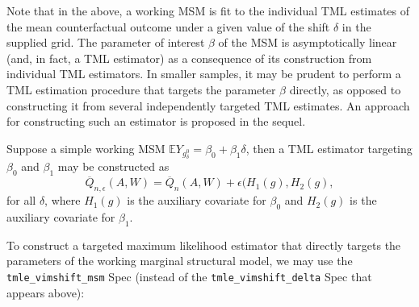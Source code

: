 \documentclass[12pt, krantz2,]{krantz}
\theoremstyle{definition}
\theoremstyle{definition}
\theoremstyle{definition}
\newcommand{\1}{\mathbbm{1}}
\begin{document}
Note that in the above, a working MSM is fit to the individual TML estimates of
the mean counterfactual outcome under a given value of the shift \(\delta\) in the
supplied grid. The parameter of interest \(\beta\) of the MSM is asymptotically
linear (and, in fact, a TML estimator) as a consequence of its construction from
individual TML estimators. In smaller samples, it may be prudent to perform a
TML estimation procedure that targets the parameter \(\beta\) directly, as opposed
to constructing it from several independently targeted TML estimates. An
approach for constructing such an estimator is proposed in the sequel.

Suppose a simple working MSM \(\mathbb{E}Y_{g^0_{\delta}} = \beta_0 + \beta_1 \delta\), then a TML estimator targeting \(\beta_0\) and \(\beta_1\) may be
constructed as
\[\overline{Q}_{n, \epsilon}(A,W) = \overline{Q}_n(A,W) + \epsilon (H_1(g),
H_2(g),\] for all \(\delta\), where \(H_1(g)\) is the auxiliary covariate for
\(\beta_0\) and \(H_2(g)\) is the auxiliary covariate for \(\beta_1\).

To construct a targeted maximum likelihood estimator that directly targets the
parameters of the working marginal structural model, we may use the
\texttt{tmle\_vimshift\_msm} Spec (instead of the \texttt{tmle\_vimshift\_delta} Spec that
appears above):
\end{document}
